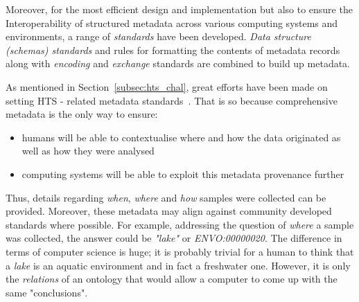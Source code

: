       Moreover, for the most efficient design and implementation 
      but also to ensure the Interoperability of structured metadata 
      across various computing systems and environments, 
      a range of \textit{standards} have been developed.  
      \textit{Data structure (schemas) standards} and
      rules for formatting the contents of metadata records 
      along with
      \textit{encoding} and \textit{exchange} standards 
      are combined to build up metadata.

      As mentioned in Section~\ref{subsec:hts_chal}, great efforts have been 
      made on setting 
      HTS - related metadata standards~\citep{yilmaz2011minimum, yilmaz2011genomic, wood2020national}.
      That is so because comprehensive metadata is the only 
      way to ensure:
      \begin{itemize}
         \setlength\itemsep{0.05em}
         \item humans will be able to contextualise where and how the data originated as well as how they were analysed
         \item computing systems will be able to exploit this metadata provenance further
      \end{itemize} 
      Thus, 
      details regarding \textit{when}, \textit{where} and \textit{how} samples were collected 
      can be provided. 
      Moreover, these metadata may align against community developed standards where possible. 
      For example, addressing the question of \textit{where} a sample was collected, 
      the answer could be \textit{"lake"} or \textit{ENVO:00000020}.
      The difference in terms of computer science is huge; 
      it is probably trivial for a human to think that a \textit{lake} is an aquatic
      environment and in fact a freshwater one. 
      However, it is only the \textit{relations} of an ontology that would allow 
      a computer to come up with the same "conclusions". 




